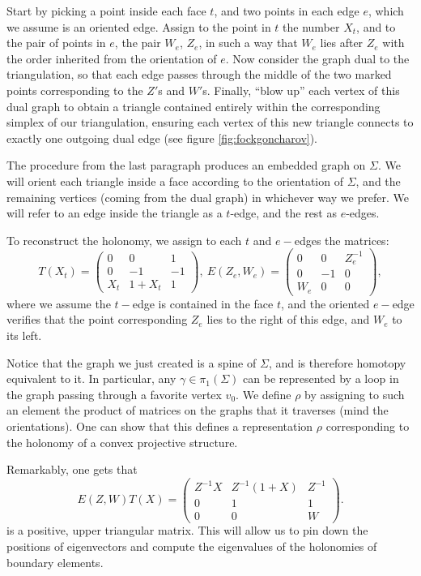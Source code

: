 \documentclass{amsart}
\theoremstyle{remark}
\theoremstyle{definition}
\begin{document}
Start by picking a point inside each face $t$, and two points in each edge $e$, which we assume is an oriented edge.
Assign to the point in $t$ the number $X_t$, and to the pair of points in $e$, the pair $W_e$, $Z_e$, in such a way that $W_e$ lies after $Z_e$ with the order inherited from the orientation of $e$.
Now consider the graph dual to the triangulation, so that each edge passes through the middle of the two marked points corresponding to the $Z'$s and $W'$s.
Finally, ``blow up'' each vertex of this dual graph to obtain a triangle contained entirely within the corresponding simplex of our triangulation, ensuring each vertex of this new triangle connects to exactly one outgoing dual edge (see figure \ref{fig:fockgoncharov}).

The procedure from the last paragraph produces an embedded graph on $\Sigma$.
We will orient each triangle inside a face according to the orientation of $\Sigma$, and the remaining vertices (coming from the dual graph) in whichever way we prefer. 
We will refer to an edge inside the triangle as a $ t$-edge, and the rest as $ e$-edges.

To reconstruct the holonomy, we assign to each $t$ and $e-$edges the matrices:
$$T(X_t) = 
\begin{pmatrix}
0 & 0 & 1\\
0 & -1 & -1\\
X_t & 1 + X_t & 1
\end{pmatrix}, \: 
E(Z_e,W_e) = 
\begin{pmatrix}
   0 & 0 & Z_e^{-1} \\
   0 & -1 & 0\\
 W_e & 0 & 0
\end{pmatrix},$$
where we assume the $t-$edge is contained in the face $t$, and the oriented $e-$edge verifies that the point corresponding $Z_e$ lies to the right of this edge, and $W_e$ to its left.

Notice that the graph we just created is a spine of $\Sigma$, and is therefore homotopy equivalent to it. 
In particular, any $\gamma \in \pi_1 (\Sigma)$ can be represented by a loop in the graph passing through a favorite vertex $v_0$.
We define $\rho$ by assigning to such an element the product of matrices on the graphs that it traverses (mind the orientations).
One can show that this defines a representation $\rho$ corresponding to the holonomy of a convex projective structure.

Remarkably, one gets that
$$E(Z,W) T(X) = 
\begin{pmatrix}
 Z^{-1} X & Z^{-1} (1+X) & Z^{-1} \\
   0 & 1 & 1\\
   0 & 0 & W
\end{pmatrix}.
$$
is a positive, upper triangular matrix.
This will allow us to pin down the positions of eigenvectors and compute the eigenvalues of the holonomies of boundary elements.
\end{document}
